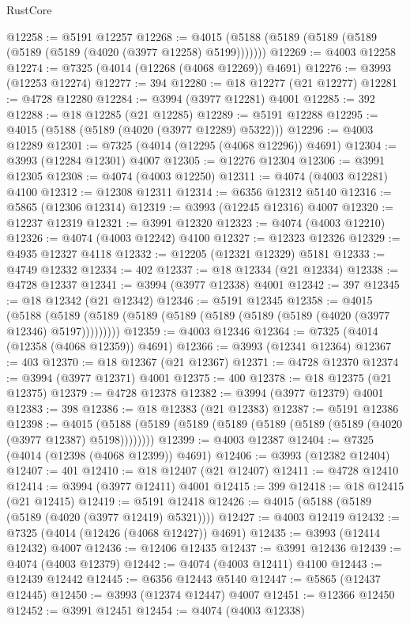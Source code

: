 \begin{lexlean}{RustCore}
\begin{coremodule}
@12258 := @5191 @12257
@12268 := @4015 (@5188 (@5189 (@5189 (@5189 (@5189 (@5189 (@4020 (@3977 @12258) @5199)))))))
@12269 := @4003 @12258
@12274 := @7325 (@4014 (@12268 (@4068 @12269)) @4691)
@12276 := @3993 (@12253 @12274)
@12277 := 394
@12280 := @18 @12277 (@21 @12277)
@12281 := @4728 @12280
@12284 := @3994 (@3977 @12281) @4001
@12285 := 392
@12288 := @18 @12285 (@21 @12285)
@12289 := @5191 @12288
@12295 := @4015 (@5188 (@5189 (@4020 (@3977 @12289) @5322)))
@12296 := @4003 @12289
@12301 := @7325 (@4014 (@12295 (@4068 @12296)) @4691)
@12304 := @3993 (@12284 @12301) @4007
@12305 := @12276 @12304
@12306 := @3991 @12305
@12308 := @4074 (@4003 @12250)
@12311 := @4074 (@4003 @12281) @4100
@12312 := @12308 @12311
@12314 := @6356 @12312 @5140
@12316 := @5865 (@12306 @12314)
@12319 := @3993 (@12245 @12316) @4007
@12320 := @12237 @12319
@12321 := @3991 @12320
@12323 := @4074 (@4003 @12210)
@12326 := @4074 (@4003 @12242) @4100
@12327 := @12323 @12326
@12329 := @4935 @12327 @4118
@12332 := @12205 (@12321 @12329) @5181
@12333 := @4749 @12332
@12334 := 402
@12337 := @18 @12334 (@21 @12334)
@12338 := @4728 @12337
@12341 := @3994 (@3977 @12338) @4001
@12342 := 397
@12345 := @18 @12342 (@21 @12342)
@12346 := @5191 @12345
@12358 := @4015
    (@5188 (@5189 (@5189 (@5189 (@5189 (@5189 (@5189 (@5189 (@4020 (@3977 @12346) @5197)))))))))
@12359 := @4003 @12346
@12364 := @7325 (@4014 (@12358 (@4068 @12359)) @4691)
@12366 := @3993 (@12341 @12364)
@12367 := 403
@12370 := @18 @12367 (@21 @12367)
@12371 := @4728 @12370
@12374 := @3994 (@3977 @12371) @4001
@12375 := 400
@12378 := @18 @12375 (@21 @12375)
@12379 := @4728 @12378
@12382 := @3994 (@3977 @12379) @4001
@12383 := 398
@12386 := @18 @12383 (@21 @12383)
@12387 := @5191 @12386
@12398 := @4015 (@5188 (@5189 (@5189 (@5189 (@5189 (@5189 (@5189 (@4020 (@3977 @12387) @5198))))))))
@12399 := @4003 @12387
@12404 := @7325 (@4014 (@12398 (@4068 @12399)) @4691)
@12406 := @3993 (@12382 @12404)
@12407 := 401
@12410 := @18 @12407 (@21 @12407)
@12411 := @4728 @12410
@12414 := @3994 (@3977 @12411) @4001
@12415 := 399
@12418 := @18 @12415 (@21 @12415)
@12419 := @5191 @12418
@12426 := @4015 (@5188 (@5189 (@5189 (@4020 (@3977 @12419) @5321))))
@12427 := @4003 @12419
@12432 := @7325 (@4014 (@12426 (@4068 @12427)) @4691)
@12435 := @3993 (@12414 @12432) @4007
@12436 := @12406 @12435
@12437 := @3991 @12436
@12439 := @4074 (@4003 @12379)
@12442 := @4074 (@4003 @12411) @4100
@12443 := @12439 @12442
@12445 := @6356 @12443 @5140
@12447 := @5865 (@12437 @12445)
@12450 := @3993 (@12374 @12447) @4007
@12451 := @12366 @12450
@12452 := @3991 @12451
@12454 := @4074 (@4003 @12338)

\end{coremodule}
\end{lexlean}

